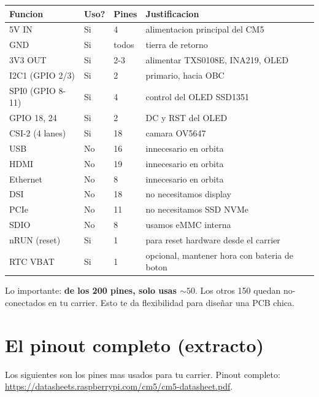 \documentclass[11pt,a4paper,oneside,openright]{book}
\begin{document}
\begin{center}
\small
\begin{tabular}{p{3.5cm}p{1cm}p{1cm}p{7cm}}
\toprule
\textbf{Funcion} & \textbf{Uso?} & \textbf{Pines} & \textbf{Justificacion} \\
\midrule
5V IN               & Si   & 4   & alimentacion principal del CM5 \\
GND                 & Si   & todos & tierra de retorno \\
3V3 OUT             & Si   & 2-3 & alimentar TXS0108E, INA219, OLED \\
I2C1 (GPIO 2/3)     & Si   & 2   & primario, hacia OBC \\
SPI0 (GPIO 8-11)    & Si   & 4   & control del OLED SSD1351 \\
GPIO 18, 24         & Si   & 2   & DC y RST del OLED \\
CSI-2 (4 lanes)     & Si   & 18  & camara OV5647 \\
USB                 & No   & 16  & innecesario en orbita \\
HDMI                & No   & 19  & innecesario en orbita \\
Ethernet            & No   & 8   & innecesario en orbita \\
DSI                 & No   & 18  & no necesitamos display \\
PCIe                & No   & 11  & no necesitamos SSD NVMe \\
SDIO                & No   & 8   & usamos eMMC interna \\
nRUN (reset)        & Si   & 1   & para reset hardware desde el carrier \\
RTC VBAT            & Si   & 1   & opcional, mantener hora con bateria de boton \\
\bottomrule
\end{tabular}
\end{center}

\begin{payload}
Lo importante: \textbf{de los 200 pines, solo usas $\sim 50$}. Los otros 150
quedan no-conectados en tu carrier. Esto te da flexibilidad para diseñar
una PCB chica.
\end{payload}

\section{El pinout completo (extracto)}

Los siguientes son los pines mas usados para tu carrier. Pinout completo:
\url{https://datasheets.raspberrypi.com/cm5/cm5-datasheet.pdf}.
\end{document}
